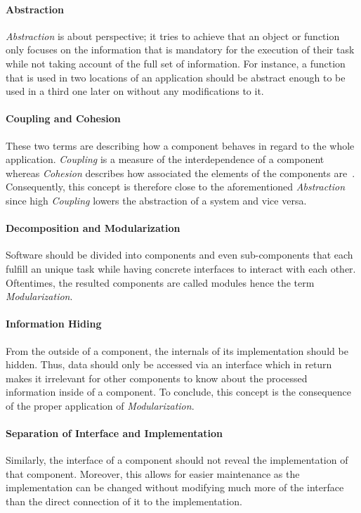\documentclass[12pt,a4paper,twoside]{report}
\begin{document}
\paragraph{Abstraction}
\textit{Abstraction} is about perspective; it tries to achieve that an object or
function only focuses on the information that is mandatory for the execution of
their task while not taking account of the full set of information.
For instance, a function that is used in two locations of an application
should be abstract enough to be used in a third one later on without
any modifications to it.

\paragraph{Coupling and Cohesion}
These two terms are describing how a component behaves in regard to the whole application.
\textit{Coupling} is a measure of the interdependence of a component whereas
\textit{Cohesion} describes how associated the elements of the components are~\cite{swebok}.
Consequently, this concept is therefore close to the aforementioned \textit{Abstraction}
since high \textit{Coupling} lowers the abstraction of a system and vice versa.

\paragraph{Decomposition and Modularization}
Software should be divided into components and even sub-components that each fulfill
an unique task while having concrete interfaces to interact with each other.
Oftentimes, the resulted components are called modules hence the term \textit{Modularization}.

\paragraph{Information Hiding}
From the outside of a component, the internals of its implementation should be hidden.
Thus, data should only be accessed via an interface which in return makes it irrelevant
for other components to know about the processed information inside of a component.
To conclude, this concept is the consequence of the proper application of \textit{Modularization}.

\paragraph{Separation of Interface and Implementation}
Similarly, the interface of a component should not reveal the implementation of
that component. Moreover, this allows for easier maintenance as the implementation
can be changed without modifying much more of the interface than the direct connection
of it to the implementation.
\end{document}

